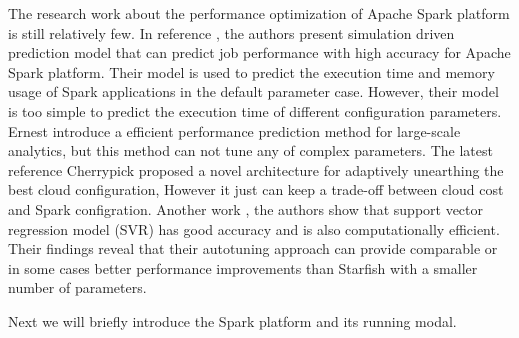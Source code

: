 \par  The research work about the performance optimization of Apache Spark platform is still relatively few. In reference \cite{wang2015High}, the authors present simulation driven prediction model that can predict job performance with high accuracy for Apache Spark platform. Their model is used to predict the execution time and memory usage of Spark applications in the default parameter case. However, their model is too simple to predict the execution time of different configuration parameters. Ernest \cite{Ernest194946} introduce a efficient performance prediction method for  large-scale analytics, but this method can not tune any of complex parameters. The latest reference Cherrypick \cite{cherrypick2015} proposed a novel architecture for adaptively unearthing the best cloud configuration, However it just can keep a trade-off between cloud cost and Spark configration. Another work \cite{yigitbase2013towards}, the authors show that support vector regression model (SVR) has good accuracy and is also computationally efficient. Their findings reveal that their autotuning approach can provide comparable or in some cases better performance improvements than Starfish with a smaller number of parameters.

Next we will briefly introduce the Spark platform and its running modal. 